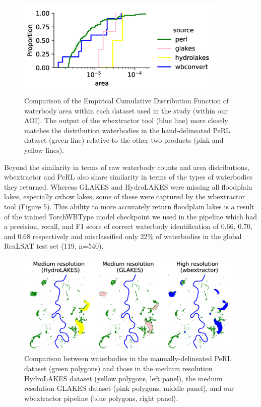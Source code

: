 \documentclass{article}
\begin{document}
\begin{figure}
	\centering
	\includegraphics[width=10cm]{../figures/accuracy}
	\caption{Comparison of the Empirical Cumulative Distribution Function of waterbody area within each dataset used in the study (within our AOI). The output of the wbextractor tool (blue line) more closely matches the distribution waterbodies in the hand-delineated PeRL dataset (green line) relative to the other two products (pink and yellow lines).}
	\label{fig:accuracy}
\end{figure}

Beyond the similarity in terms of raw waterbody counts and area distributions, wbextractor and PeRL also share similarity in terms of the types of waterbodies they returned. Whereas GLAKES and HydroLAKES were missing all floodplain lakes, especially oxbow lakes, some of these were captured by the wbextractor tool (Figure 5). This ability to more accurately return floodplain lakes is a result of the trained TorchWBType model checkpoint we used in the pipeline which had a precision, recall, and F1 score of correct waterbody identification of 0.66, 0.70, and 0.68 respectively and misclassified only 22\% of waterbodies in the global ReaLSAT test set (119, n=540).

\begin{figure}
	\centering
	\includegraphics[width=11cm]{../figures/floodplain}
	\caption{Comparison between waterbodies in the manually-delineated PeRL dataset (green polygons) and those in the medium resolution HydroLAKES dataset (yellow polygons, left panel), the medium resolution GLAKES dataset (pink polygons, middle panel), and our wbextractor pipeline (blue polygons, right panel).}
	\label{fig:floodplain}
\end{figure}
\end{document}
